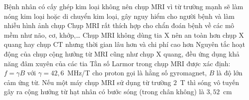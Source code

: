 \begin{ex}
\begin{center}
		\end{center}
		\choiceTFt
		{\True Bệnh nhân có cấy ghép kim loại không nên chụp MRI vì từ trường mạnh sẽ làm nóng kim loại hoặc di chuyển kim loại, gây nguy hiểm cho người bệnh và làm nhiễu hình ảnh chụp}
		{\True Chụp MRI rất thích hợp cho chẩn đoán bệnh về các mô mềm như não, cơ, khớp,\ldots{} Chụp MRI không dùng tia X nên an toàn hơn chụp X quang hay chụp CT nhưng thời gian lâu hơn và chi phí cao hơn}
		{Nguyên tắc hoạt động của chụp cộng hưởng từ MRI cũng như chụp X quang, đều ứng dụng khả năng đâm xuyên của các tia}
		{Tần số Larmor trong chụp MRI được xác định: $f=\gamma B$ với $\gamma=42{,}6$~MHz/T cho proton gọi là hằng số gyromagnet, $B$ là độ lớn cảm ứng từ. Nếu một máy chụp MRI sử dụng từ trường $2$~T thì sóng vô tuyến gây ra cộng hưởng từ hạt nhân có bước sóng (trong chân không) là $3{,}52$~cm}
	\end{ex}

